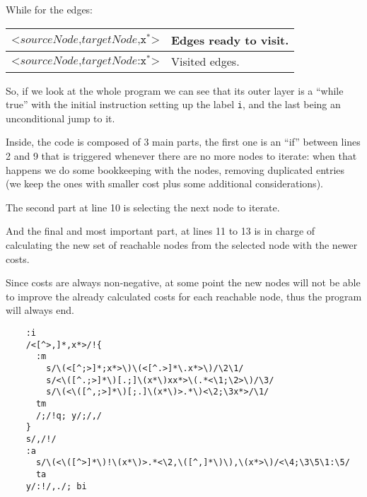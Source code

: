 While for the edges:
\begin{center}
	\begin{tabular}{|l|l|}
		\hline
		$\texttt{<}sourceNode\texttt{,}targetNode\texttt{,x}^*\texttt{>}$
			& Edges ready to visit.\\
		\hline
		$\texttt{<}sourceNode\texttt{,}targetNode\texttt{:x}^*\texttt{>}$
			& Visited edges.\\
		\hline
	\end{tabular}
\end{center}

So, if we look at the whole program we can see that its outer layer is a
``while true'' with the initial instruction setting up the label \verb|i|,
and the last being an unconditional jump to it.

Inside, the code is composed of 3 main parts, the first one is an ``if''
between lines 2 and 9 that is triggered whenever there are no more nodes
to iterate: when that happens we do some bookkeeping with the nodes,
removing duplicated entries (we keep the ones with smaller cost
plus some additional considerations).

The second part at line 10 is selecting the next node to iterate.

And the final and most important part, at lines 11 to 13 is in charge of
calculating the new set of reachable nodes from the selected node with
the newer costs.

Since costs are always non-negative, at some point the new nodes will
not be able to improve the already calculated costs for each reachable
node, thus the program will always end.

\begin{Verbatim}
	:i
	/<[^>,]*,x*>/!{
	  :m
	    s/\(<[^;>]*;x*>\)\(<[^.>]*\.x*>\)/\2\1/
	    s/<\([^.;>]*\)[.;]\(x*\)xx*>\(.*<\1;\2>\)/\3/
	    s/\(<\([^,;>]*\)[;.]\(x*\)>.*\)<\2;\3x*>/\1/
	  tm
	  /;/!q; y/;/,/
	}
	s/,/!/
	:a
	  s/\(<\([^>]*\)!\(x*\)>.*<\2,\([^,]*\)\),\(x*>\)/<\4;\3\5\1:\5/
	  ta
	y/:!/,./; bi
\end{Verbatim}

